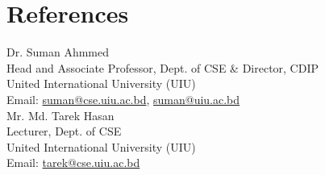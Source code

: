 \documentclass[a4paper,11pt]{article}
\begin{document}
\par\vspace{2mm}

\par\vspace{2mm}


\section{References}
\noindent\small
Dr. Suman Ahmmed \\
Head and Associate Professor, Dept. of CSE \& Director, CDIP \\
United International University (UIU) \\
Email: \href{mailto:suman@cse.uiu.ac.bd}{suman@cse.uiu.ac.bd}, \href{mailto:suman@uiu.ac.bd}{suman@uiu.ac.bd}
\vspace{2mm}\\
Mr. Md. Tarek Hasan \\
Lecturer, Dept. of CSE \\
United International University (UIU) \\
Email: \href{mailto:tarek@cse.uiu.ac.bd}{tarek@cse.uiu.ac.bd}
\par
\end{document}

